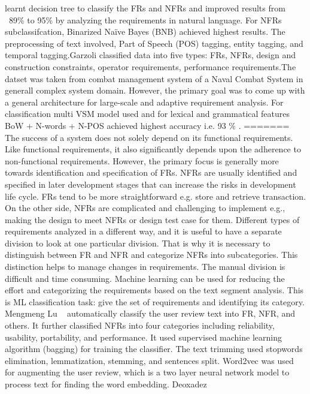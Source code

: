 learnt decision tree to classify the FRs and NFRs and improved results from ~89\% to 95\% by analyzing the requirements in natural language. For NFRs subclassifcation, Binarized Naïve Bayes (BNB) achieved highest results. The preprocessing of text involved, Part of Speech (POS) tagging, entity tagging, and temporal tagging.Garzoli \cite {Garzoli:2013} classified data into five types: FRs, NFRs, design and construction constraints, operator requirements, performance requirements.The datset was taken from combat management system of a Naval Combat System in generall complex system domain. However, the primary goal was to come up with a general architecture for large-scale and adaptive requirement analysis. For classification multi VSM model used and for lexical and grammatical features BoW + N-words + N-POS achieved highest accuracy i.e. 93 \% .
=======
The success of a system does not solely depend on its functional requirements.
Like functional requirements, it also significantly depends upon the adherence
to non-functional requirements. However, the primary focus is generally more
towards identification and specification of FRs. NFRs are usually identified and
specified in later development stages that can increase the risks in development
life cycle. FRs tend to be more straightforward e.g. store and retrieve
transaction. On the other side, NFRs are complicated and challenging to
implement e.g., making the design to meet NFRs or design test case for them.
Different types of requirements analyzed in a different way, and it is useful to
have a separate division to look at one particular division. That is why it is
necessary to distinguish between FR and NFR and categorize NFRs into
subcategories. This distinction helps to manage changes in requirements. The
manual division is difficult and time consuming. Machine learning can be used
for reducing the effort and categorizing the requirements based on the text
segment analysis. This is ML classification task: give the set of requirements
and identifying its category.\\
Mengmeng Lu \etal~ \cite{Lu:2017} automatically classify the user review text
into FR, NFR, and others. It further classified NFRs into four categories
including reliability, usability, portability, and performance. It used
supervised machine learning algorithm (bagging) for training the classifier. The
text trimming used stopwords elimination, lemmatization, stemming, and sentences
split. Word2vec was used for augmenting the user review, which is a two layer
neural network model to process text for finding the word embedding. Deoxadez
